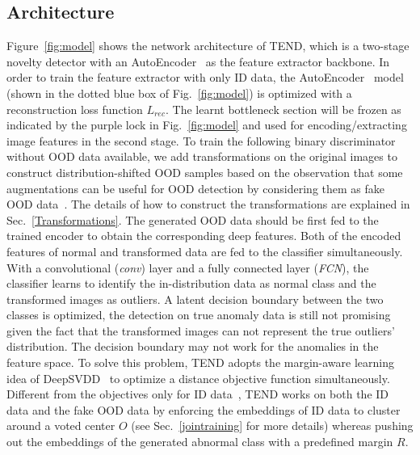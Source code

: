 \documentclass[12pt]{spieman}  %
\begin{document}
\begin{spacing}{2}
\subsection{Architecture}
Figure~\ref{fig:model} shows the network architecture of TEND, which is a two-stage novelty detector with an AutoEncoder~\cite{mcclelland1986parallel} as the feature extractor backbone. In order to train the feature extractor with only ID data, the AutoEncoder~\cite{mcclelland1986parallel} model (shown in the dotted blue box of Fig.~\ref{fig:model}) is optimized with a reconstruction loss function $L_{rec}$. The learnt bottleneck section will be frozen as indicated by the purple lock in Fig.~\ref{fig:model} and used for encoding/extracting image features in the second stage. To train the following binary discriminator without OOD data available, we add transformations on the original images to construct distribution-shifted OOD samples based on the observation that some augmentations can be useful for OOD detection by considering them as fake OOD data~\cite{tack2020csi:tack}. The details of how to construct the transformations are explained in Sec.~\ref{Transformations}. The generated OOD data should be first fed to the trained encoder to obtain the corresponding deep features. Both of the encoded features of normal and  transformed data are fed to the classifier simultaneously. With a convolutional (\textit{conv}) layer and a fully connected layer (\textit{FCN}), the classifier learns to identify the in-distribution data as normal class and the transformed images as outliers. A latent decision boundary between the two classes is optimized, the detection on true anomaly data is still not promising given the fact that the transformed images can not represent the true outliers' distribution. The decision boundary may not work for the anomalies in the feature space. To solve this problem, TEND adopts the margin-aware learning idea of DeepSVDD~\cite{ruff2018deep:ruff} to optimize a distance objective function simultaneously. Different from the objectives only for ID data~\cite{ruff2018deep:ruff}, TEND works on both the ID data and the fake OOD data by enforcing the embeddings of ID data to cluster around a voted center $O$ (see Sec.~\ref{jointraining} for more details) whereas pushing out the embeddings of the generated abnormal class with a predefined margin $R$.   


\end{spacing}
\end{document}

